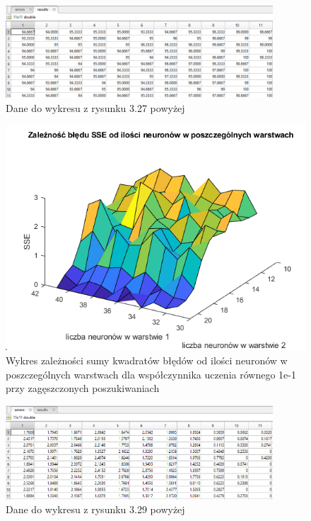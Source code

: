 \documentclass[a4paper, 12pt]{article}
\begin{document}
\begin{figure}[ht]
	\centering
	\includegraphics[width=10cm]{s1s2 pk dane}
	\caption{Dane do wykresu z rysunku 3.27 powyżej}
\label{Fig:lr1 sse dane}
\end{figure}

\begin{figure}[ht]
	\centering
	\includegraphics[width=14cm]{s1s2 sse}
	\caption{Wykres zależności sumy kwadratów błędów od ilości neuronów w poszczególnych warstwach dla współczynnika uczenia równego 1e-1 przy zagęszczonych poszukiwaniach}
\label{Fig:lr1 sse dane}
\end{figure}

\begin{figure}[ht]
	\centering
	\includegraphics[width=10cm]{s1s2 sse dane}
	\caption{Dane do wykresu z rysunku 3.29 powyżej}
\label{Fig:lr1 sse dane}
\end{figure}
\end{document}
